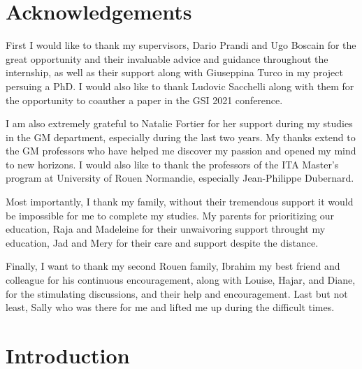 \documentclass[american,]{article}
\theoremstyle{definition}
\theoremstyle{definition}
\theoremstyle{definition}
\theoremstyle{remark}
\begin{document}
\def\Aut{\mathrm{Aut}}

\def\qtext#1{\quad\text{#1}\quad}

\def\argmin{\mathop{\mathrm{argmin}}}
\def\argmax{\mathop{\mathrm{argmax}}}
\def\supp{\mathop{\mathrm{supp}}}

\def\transp#1{{#1}^{\top}}

\def\stft #1{\mathrm{STFT}\sset{#1}}
\def\STFT{\mathrm{STFT}}
\def\Proj{\mathrm{Proj}}

\def\Cd{\mathrm{Cauchy}}

\pagebreak

\hypertarget{acknowledgements}{%
\section*{Acknowledgements}\label{acknowledgements}}

First I would like to thank my supervisors, Dario Prandi and Ugo Boscain
for the great opportunity and their invaluable advice and guidance throughout the internship,
as well as their support along with Giuseppina Turco in my project persuing a PhD.
I would also like to thank Ludovic Sacchelli along with them for the opportunity
to coauther a paper in the GSI 2021 conference.

I am also extremely grateful to Natalie Fortier for her support during my studies
in the GM department, especially during the last two years.
My thanks extend to the GM professors who have helped me discover my passion
and opened my mind to new horizons.
I would also like to thank the professors of the ITA Master's program
at University of Rouen Normandie, especially Jean-Philippe Dubernard.

Most importantly, I thank my family, without their tremendous support
it would be impossible for me to complete my studies.
My parents for prioritizing our education, Raja and Madeleine
for their unwaivoring support throught my education,
Jad and Mery for their care and support despite the distance.

Finally, I want to thank my second Rouen family, Ibrahim
my best friend and colleague for his continuous encouragement,
along with Louise, Hajar, and Diane, for the stimulating discussions,
and their help and encouragement.
Last but not least, Sally who was there for me and lifted me up
during the difficult times.

\pagebreak

\hypertarget{introduction}{%
\section{Introduction}\label{introduction}}
\end{document}
